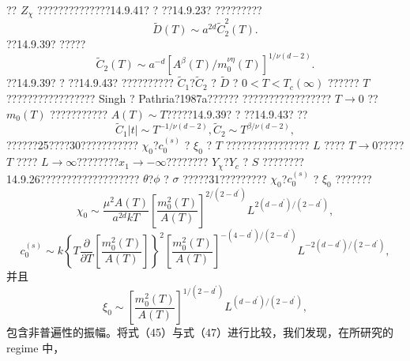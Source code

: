 ?? \(Z_{\chi}\) ??????????????14.9.41? ? ??14.9.23? ?????????
\begin{equation}\tag{14.4.96}\label{eq:14.4.96}
\tilde { D } ( T ) \sim a ^{2 d} \tilde { C } _ { 2 } ^{2} ( T ) .
\end{equation}
??14.9.39? ?????
\begin{equation}\tag{14.4.97}\label{eq:14.4.97}
\tilde { C } _ { 2 } ( T ) \sim a ^{- d} [ A ^{\beta} ( T ) / m _ { 0 } ^{\nu \eta} ( T ) ] ^{1 / \nu ( d - 2 )} .
\end{equation}
??14.9.39? ? ??14.9.43? ?????????? \(\tilde{C}_{1}\)?\(\tilde{C}_{2}\) ? \(\tilde{D}\) ? \(0 < T < T_c(\infty)\) ?????? \(T\) ????????????????? Singh ? Pathria?1987a??????
????????????????? \(T \to 0\) ??\(m_0(T)\) ??????????? \(A(T) \sim T\)?????14.9.39? ? ??14.9.43? ??
\begin{equation}\tag{14.4.98}\label{eq:14.4.98}
\tilde { C } _ { 1 } | t | \sim T ^{- 1 / \nu ( d - 2 )} ,  \tilde { C } _ { 2 } \sim T ^{\beta / \nu ( d - 2 )} ,
\end{equation}
??????25????30??????????? \(\chi_{0}\)?\(c_{0}^{(s)}\) ? \(\xi_{0}\) ? \(T\) ???????????????? \(L\) ???? \(T \to 0\)????? \(T\) ???? \(L \to \infty\)????????\(x_{1} \to -\infty\)???????? \(Y_{\chi}\)?\(Y_{c}\) ? \(S\) ????????14.9.26??????????????????? \(\theta\)?\(\phi\) ? \(\sigma\) ?????31????????? \(\chi_{0}\)?\(c_{0}^{(s)}\) ? \(\xi_{0}\) ???????
\begin{equation}\tag{14.4.99}\label{eq:14.4.99}
\chi _ { 0 } \sim \frac { \mu ^{2} A ( T ) } { a ^{2 d} k T } \left[ \frac { m _ { 0 } ^{2} ( T ) } { A ( T ) } \right] ^{2 / ( 2 - d ^ { \prime} ) } L ^{2 ( d - d ^ { \prime} ) / ( 2 - d ^{\prime} ) } ,
\end{equation}
\begin{equation}\tag{14.4.100}\label{eq:14.4.100}
c _ { 0 } ^{( s )} \sim k \left\{ T \frac { \partial } { \partial T } \left[ \frac { m _ { 0 } ^{2} ( T ) } { A ( T ) } \right] \right\} ^{2} \left[ \frac { m _ { 0 } ^{2} ( T ) } { A ( T ) } \right] ^{- ( 4 - d ^ { \prime} ) / ( 2 - d ^{\prime} ) } L ^{- 2 ( d - d ^ { \prime} ) / ( 2 - d ^{\prime} ) } ,
\end{equation}
并且
\begin{equation}\tag{14.4.101}\label{eq:14.4.101}
\xi _ { 0 } \sim \left[ \frac { m _ { 0 } ^{2} ( T ) } { A ( T ) } \right] ^{1 / ( 2 - d ^ { \prime} ) } L ^{( d - d ^ { \prime} ) / ( 2 - d ^{\prime} ) } ,
\end{equation}
包含非普遍性的振幅。将式（45）与式（47）进行比较，我们发现，在所研究的 regime 中，
